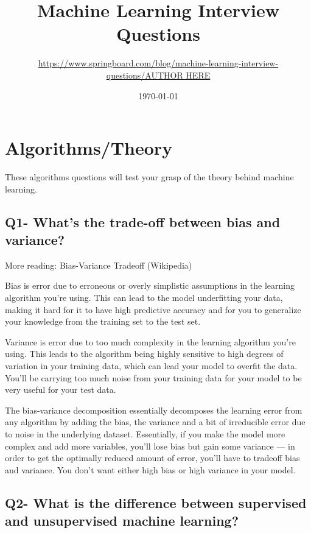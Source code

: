 \documentclass[11pt,a4paper]{article}
\begin{document}
   \title{Machine Learning Interview Questions}
  \author{\href{https://www.springboard.com/blog/machine-learning-interview-questions/}{https://www.springboard.com/blog/machine-learning-interview-questions/AUTHOR HERE}}
 \date{\today}
\maketitle



\section{Algorithms/Theory}
These algorithms questions will test your grasp of the theory behind machine learning.

\subsection{Q1- What’s the trade-off between bias and variance?}

More reading: Bias-Variance Tradeoff (Wikipedia)

Bias is error due to erroneous or overly simplistic assumptions in the learning algorithm you’re using. This can lead to the model underfitting your data, making it hard for it to have high predictive accuracy and for you to generalize your knowledge from the training set to the test set.

Variance is error due to too much complexity in the learning algorithm you’re using. This leads to the algorithm being highly sensitive to high degrees of variation in your training data, which can lead your model to overfit the data. You’ll be carrying too much noise from your training data for your model to be very useful for your test data.

The bias-variance decomposition essentially decomposes the learning error from any algorithm by adding the bias, the variance and a bit of irreducible error due to noise in the underlying dataset. Essentially, if you make the model more complex and add more variables, you’ll lose bias but gain some variance — in order to get the optimally reduced amount of error, you’ll have to tradeoff bias and variance. You don’t want either high bias or high variance in your model.

\subsection{Q2- What is the difference between supervised and unsupervised machine learning?}
\end{document}
